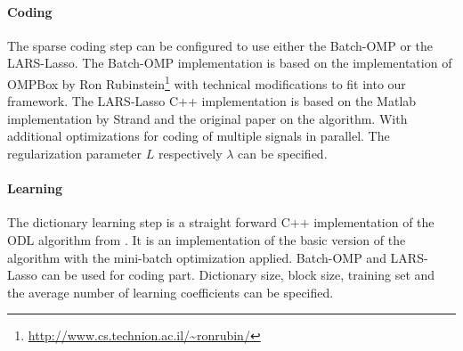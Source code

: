 
\paragraph{Coding}
The sparse coding step can be configured to use either the Batch-OMP 
or the LARS-Lasso.
The Batch-OMP implementation is based on the implementation
of OMPBox by Ron
Rubinstein\footnote{\url{http://www.cs.technion.ac.il/~ronrubin/}} with
technical modifications to fit into our
framework. The LARS-Lasso C++ implementation is based on the Matlab
implementation by Strand\cite{Strand2005} and the original
paper\cite{Efron2004} on the algorithm. With additional optimizations
for coding of multiple signals in parallel. The regularization parameter $L$
respectively $\lambda$ can be specified. 

\paragraph{Learning}
The dictionary learning step is a straight forward C++ implementation of the
ODL algorithm from . It is an
implementation of the basic version of the algorithm with the mini-batch
optimization applied. Batch-OMP and LARS-Lasso can be used for coding part.
Dictionary size, block size, training set and the average number of learning
coefficients can be specified.

